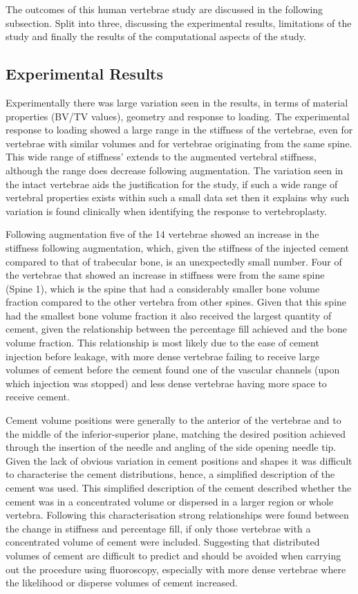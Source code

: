 The outcomes of this human vertebrae study are discussed in the following
subsection. Split into three, discussing the experimental results, limitations
of the study and finally the results of the computational aspects of the study.

\subsection{Experimental Results}

Experimentally there was large variation seen in the results, in terms of
material properties (BV/TV values), geometry and response to loading.  The
experimental response to loading showed a large range in the stiffness of the
vertebrae, even for vertebrae with similar volumes and for vertebrae
originating from the same spine.  This wide range of stiffness' extends to the
augmented vertebral stiffness, although the range does decrease following
augmentation.  The variation seen in the intact vertebrae aids the
justification for the study, if such a wide range of vertebral properties
exists within such a small data set then it explains why such variation is
found clinically when identifying the response to vertebroplasty.

Following augmentation five of the 14 vertebrae showed an increase in the
stiffness following augmentation, which, given the stiffness of the injected
cement compared to that of trabecular bone, is an unexpectedly small number.
Four of the vertebrae that showed an increase in stiffness were from the same
spine (Spine 1), which is the spine that had a considerably smaller bone volume
fraction compared to the other vertebra from other spines.  Given that this
spine had the smallest bone volume fraction it also received the largest
quantity of cement, given the relationship between the percentage fill achieved
and the bone volume fraction.  This relationship is most likely due to the ease
of cement injection before leakage, with more dense vertebrae failing to
receive large volumes of cement before the cement found one of the vascular
channels (upon which injection was stopped) and less dense vertebrae having
more space to receive cement.

Cement volume positions were generally to the anterior of the vertebrae and to
the middle of the inferior-superior plane, matching the desired position
achieved through the insertion of the needle and angling of the side opening
needle tip.  Given the lack of obvious variation in cement positions and shapes
it was difficult to characterise the cement distributions, hence, a simplified
description of the cement was used.  This simplified description of the cement
described whether the cement was in a concentrated volume or dispersed in a
larger region or whole vertebra.  Following this characterisation strong
relationships were found between the change in stiffness and percentage fill,
if only those vertebrae with a concentrated volume of cement were included.
Suggesting that distributed volumes of cement are difficult to predict and
should be avoided when carrying out the procedure using fluoroscopy, especially
with more dense vertebrae where the likelihood or disperse volumes of cement
increased.


